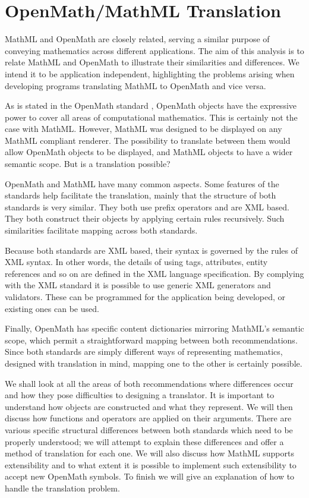 \chapter{OpenMath/MathML Translation} \label{analysis}

MathML and OpenMath are closely related, serving a similar purpose of
conveying mathematics across different applications. The aim of this
analysis is to relate MathML and OpenMath to illustrate their
similarities and differences. We intend it to be application
independent, highlighting the problems arising when developing programs
translating MathML to OpenMath and vice versa.

As is stated in the OpenMath standard \cite{openmathspec}, OpenMath
objects have the expressive power to cover all areas of computational
mathematics. This is certainly not the case with MathML. However,
MathML was designed to be displayed on any MathML compliant renderer.  
The possibility to translate between them would allow OpenMath objects
to be displayed, and MathML objects to have a wider semantic scope. But is
a translation possible?

OpenMath and MathML have many common aspects. Some features of the
standards help facilitate the translation, mainly that the structure of
both standards is very similar.  They both use prefix operators and are
XML \cite{xml} based. They both construct their objects by
applying certain rules recursively. Such similarities facilitate
mapping across both standards.

Because both standards are XML based, their syntax is governed by the
rules of XML syntax. In other words, the details of using tags,
attributes, entity references and so on are defined in the XML language
specification. By complying with the XML standard it is possible to use
generic XML generators and validators. These can be programmed for the
application being developed, or existing ones can be used.

Finally, OpenMath has specific content dictionaries mirroring MathML's semantic scope, which permit a
straightforward mapping between both recommendations. Since both
standards are simply different ways of representing mathematics,
designed with translation in mind, mapping one to the other is
certainly possible.

We shall look at all the areas of both recommendations where
differences occur and how they pose difficulties to designing a
translator. It is important to understand how objects are constructed
and what they represent. We will then discuss how functions and
operators are applied on their arguments. There are various specific
structural differences between both standards which need to be properly
understood; we will attempt to explain these differences and offer a
method of translation for each one. We will also discuss how MathML
supports extensibility and to what extent it is possible to implement
such extensibility to accept new OpenMath symbols. To finish we will
give an explanation of how to handle the translation problem.


